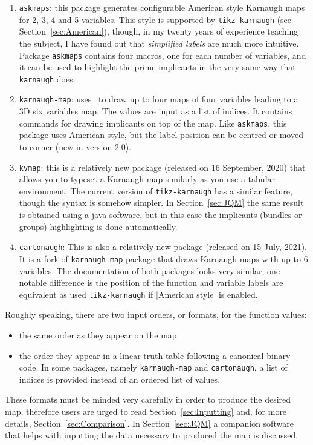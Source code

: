 \documentclass[a4paper]{ltxdoc}
\begin{document}
\begin{enumerate}
\item \verb|askmaps|: this package generates configurable American style Karnaugh maps for 2, 3, 4 and 5 variables. This style is supported by \verb|tikz-karnaugh| (see Section~\ref{sec:American}), though, in my twenty years of experience teaching the subject, I have found out that \emph{simplified labels} are much more intuitive. Package \verb|askmaps| contains four macros, one for each number of variables, and it can be used to highlight the prime implicants in the very same way that \verb|karnaugh| does.
\item \verb|karnaugh-map|: uses \tikzname\ to draw up to four maps of four variables leading to a 3D six variables map. The values are input as a list of indices. It contains commands for drawing implicants on top of the map. Like \verb|askmaps|, this package uses American style, but the label position can be centred or moved to corner (new in version 2.0).
\item \verb|kvmap|: this is a relatively new package (released on 16 September, 2020) that allows you to typeset a Karnaugh map similarly as you use a tabular environment. The current version of \verb|tikz-karnaugh| has a similar feature, though the syntax is somehow simpler. In Section~\ref{sec:JQM} the same result is obtained using a java software, but in this case the implicants (bundles or groups) highlighting is done automatically.
\item \verb|cartonaugh|: This is also a relatively new package (released on 15 July, 2021). It is a fork of \verb|karnaugh-map| package that draws Karnaugh maps with up to 6 variables. The documentation of both packages looks very similar; one notable difference is the position of the function and variable labels are equivalent as used \verb|tikz-karnaugh| if |American style| is enabled.
\end{enumerate}

Roughly speaking, there are two input orders, or formats, for the function values: 
\begin{itemize}
\item the same order as they appear on the map.
\item the order they appear in a linear truth table following a canonical binary code. In some packages, namely \verb|karnaugh-map| and \verb|cartonaugh|, a list of indices is provided instead of an ordered list of values.
\end{itemize}

These formats must be minded very carefully in order to produce the desired map, therefore users are urged to read Section~\ref{sec:Inputting} and, for more details, Section~\ref{sec:Comparison}. In Section~\ref{sec:JQM} a companion software that helps with inputting the data necessary to produced the map is discussed. 
\end{document}
